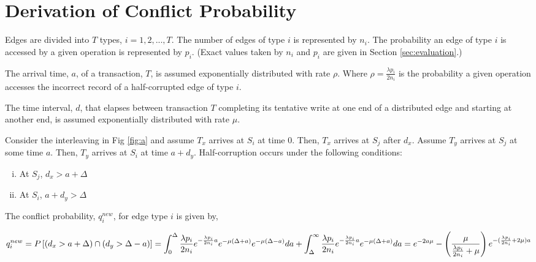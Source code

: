 \section{Derivation of Conflict Probability}
\label{sec:deriv-confl-prob}

Edges are divided into $T$ types, $i= 1,2, ..., T$. The number of edges of type $i$ is represented by $n_i$. 
The probability an edge of type $i$ is accessed by a given operation is represented by $p_i$.  (Exact values taken by $n_i$ and $p_i$ are given in Section \ref{sec:evaluation}.)

The arrival time, $a$, of a transaction, $T$, is assumed exponentially distributed with rate $\rho$. 
Where $ \rho  = \frac{\lambda p_i}{2n_i}$ is the probability a given operation accesses the incorrect record of a half-corrupted edge of type $i$.

The time interval, $d$, that elapses between transaction $T$ completing its tentative write at one end of a distributed edge and starting at another end, is assumed exponentially distributed with rate $\mu$.

Consider the interleaving in Fig \ref{fig:a} and assume $T_x$ arrives at $S_i$ at time $0$. Then, $T_x$ arrives at $S_j$ after $d_x$. Assume $T_y$ arrives at $S_j$ at some time $a$. Then, $T_y$ arrives at $S_i$ at time $a  + d_y$.
Half-corruption occurs under the following conditions:
\begin{enumerate}[(i)]
    \item At $S_j$, $d_x > a + \Delta$
    \item At $S_i$, $a  + d_y > \Delta$
\end{enumerate}
The conflict probability, $q^{new}_{i}$, for edge type $i$ is given by,

\begin{dmath*}
   q^{new}_{i} =  {P \left[ (d_x > a + \Delta) \cap (d_y > \Delta - a)  \right]} \\
   =  \int_{0}^{\Delta}  \frac{\lambda p_i}{2 n_i} e^{-\frac{\lambda p_i}{2 n_i} a} e^{-\mu (\Delta+a)} e^{-\mu (\Delta-a)} da + \int_{\Delta}^{\infty} \frac{\lambda p_i}{2 n_i} e^{-\frac{\lambda p_i}{2 n_i} a} e^{-\mu (\Delta+a)} da \\
   =  e^{-2 a \mu} - \left( \frac{\mu}{\frac{\lambda p_i}{2 n_i} + \mu} \right) e^{-(\frac{\lambda p_i}{2 n_i}+ 2\mu)a} \\
 \end{dmath*}

